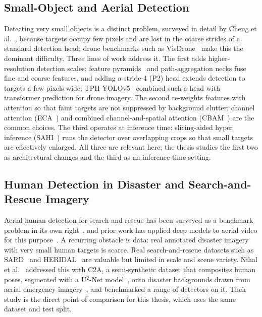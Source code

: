\subsection{Small-Object and Aerial Detection}
Detecting very small objects is a distinct problem, surveyed in detail by Cheng et
al.~\cite{cheng2023smallobject}, because targets occupy few pixels and are lost in
the coarse strides of a standard detection head; drone benchmarks such as
VisDrone~\cite{zhu2021visdrone} make this the dominant difficulty. Three lines of
work address it. The first adds higher-resolution detection scales: feature
pyramids~\cite{lin2017fpn} and path-aggregation necks fuse fine and coarse features,
and adding a stride-4 (P2) head extends detection to targets a few pixels wide;
TPH-YOLOv5~\cite{zhu2021tphyolov5} combined such a head with transformer prediction
for drone imagery. The second re-weights features with attention so that faint
targets are not suppressed by background clutter; channel attention
(ECA~\cite{wang2020eca}) and combined channel-and-spatial attention
(CBAM~\cite{woo2018cbam}) are the common choices. The third operates at inference
time: slicing-aided hyper inference (SAHI~\cite{akyon2022sahi}) runs the detector
over overlapping crops so that small targets are effectively enlarged. All three are
relevant here; the thesis studies the first two as architectural changes and the
third as an inference-time setting.

\subsection{Human Detection in Disaster and Search-and-Rescue Imagery}
Aerial human detection for search and rescue has been surveyed as a benchmark
problem in its own right~\cite{sar_survey}, and prior work has applied deep models
to aerial video for this purpose~\cite{aerial_human_video}. A recurring obstacle is
data: real annotated disaster imagery with very small human targets is scarce. Real
search-and-rescue datasets such as SARD~\cite{sambolek2021sard} and
HERIDAL~\cite{bozic2019heridal} are valuable but limited in scale and scene variety.
Nihal et al.~\cite{nihal2024c2a} addressed this with C2A, a semi-synthetic dataset
that composites human poses, segmented with a U$^2$-Net model~\cite{qin2020u2net},
onto disaster backgrounds drawn from aerial emergency
imagery~\cite{kyrkou2020aider}, and benchmarked a range of detectors on it. Their
study is the direct point of comparison for this thesis, which uses the same dataset
and test split.

